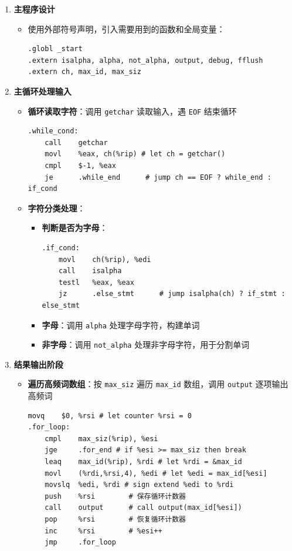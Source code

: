 \documentclass[10pt,a4paper]{article}
\begin{document}
\begin{enumerate}
    \item \textbf{主程序设计}
    \begin{itemize}
        \item 使用外部符号声明，引入需要用到的函数和全局变量：
        \begin{lstlisting}[language={[x86masm]Assembler}]
.globl _start
.extern isalpha, alpha, not_alpha, output, debug, fflush
.extern ch, max_id, max_siz
        \end{lstlisting}
    \end{itemize}
    
    \item \textbf{主循环处理输入}
    \begin{itemize}
        \item \textbf{循环读取字符}：调用 \verb|getchar| 读取输入，遇 \verb|EOF| 结束循环
        \begin{lstlisting}[language={[x86masm]Assembler}]
.while_cond:
    call    getchar
    movl    %eax, ch(%rip) # let ch = getchar()
    cmpl    $-1, %eax
    je      .while_end      # jump ch == EOF ? while_end : if_cond
        \end{lstlisting}
        
        \item \textbf{字符分类处理}：
        \begin{itemize}
            \item \textbf{判断是否为字母}：
            \begin{lstlisting}[language={[x86masm]Assembler}]
.if_cond:
    movl    ch(%rip), %edi
    call    isalpha
    testl   %eax, %eax
    jz      .else_stmt      # jump isalpha(ch) ? if_stmt : else_stmt
            \end{lstlisting}
            
            \item \textbf{字母}：调用 \verb|alpha| 处理字母字符，构建单词
            \item \textbf{非字母}：调用 \verb|not_alpha| 处理非字母字符，用于分割单词
        \end{itemize}
    \end{itemize}
    
    \item \textbf{结果输出阶段}
    \begin{itemize}
        \item \textbf{遍历高频词数组}：按 \verb|max_siz| 遍历 \verb|max_id| 数组，调用 \verb|output| 逐项输出高频词
        \begin{lstlisting}[language={[x86masm]Assembler}]
    movq    $0, %rsi # let counter %rsi = 0
.for_loop:
    cmpl    max_siz(%rip), %esi
    jge     .for_end # if %esi >= max_siz then break
    leaq    max_id(%rip), %rdi # let %rdi = &max_id
    movl    (%rdi,%rsi,4), %edi # let %edi = max_id[%esi]
    movslq  %edi, %rdi # sign extend %edi to %rdi
    push    %rsi        # 保存循环计数器
    call    output      # call output(max_id[%esi])
    pop     %rsi        # 恢复循环计数器
    inc     %rsi        # %esi++
    jmp     .for_loop
        \end{lstlisting}
    \end{itemize}
    

\end{enumerate}
\end{document}

